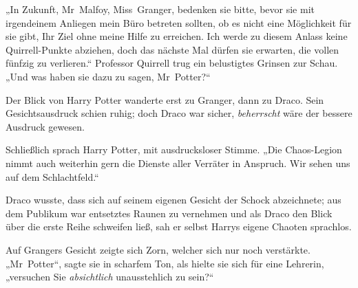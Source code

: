 „In Zukunft, Mr~Malfoy, Miss~Granger, bedenken sie bitte, bevor sie mit irgendeinem Anliegen mein Büro betreten sollten, ob es nicht eine Möglichkeit für sie gibt, Ihr Ziel ohne meine Hilfe zu erreichen. Ich werde zu diesem Anlass keine Quirrell-Punkte abziehen, doch das nächste Mal dürfen sie erwarten, die vollen fünfzig zu verlieren.“ Professor Quirrell trug ein belustigtes Grinsen zur Schau.
„Und was haben sie dazu zu sagen, Mr~Potter?“

Der Blick von Harry Potter wanderte erst zu Granger, dann zu Draco. Sein Gesichtsausdruck schien ruhig; doch Draco war sicher, \emph{beherrscht} wäre der bessere Ausdruck gewesen.

Schließlich sprach Harry Potter, mit ausdrucksloser Stimme.
„Die Chaos-Legion nimmt auch weiterhin gern die Dienste aller Verräter in Anspruch. Wir sehen uns auf dem Schlachtfeld.“

Draco wusste, dass sich auf seinem eigenen Gesicht der Schock abzeichnete; aus dem Publikum war entsetztes Raunen zu vernehmen und als Draco den Blick über die erste Reihe schweifen ließ, sah er selbst Harrys eigene Chaoten sprachlos.

Auf Grangers Gesicht zeigte sich Zorn, welcher sich nur noch verstärkte.
„Mr~Potter“, sagte sie in scharfem Ton, als hielte sie sich für eine Lehrerin, „versuchen Sie \emph{absichtlich} unausstehlich zu sein?“

